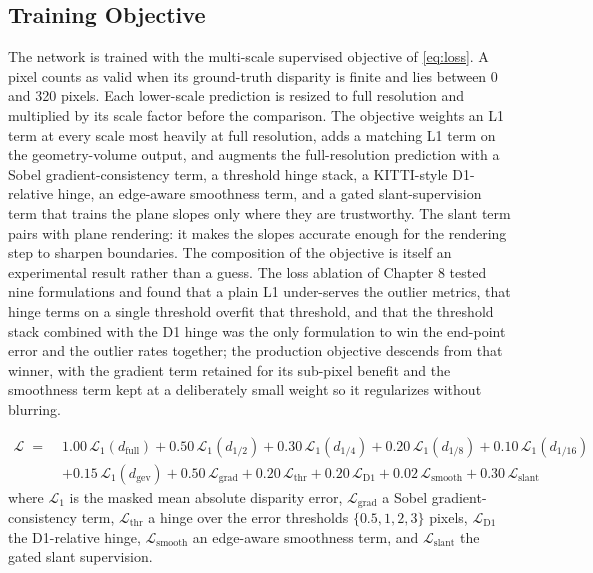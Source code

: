 \subsection{Training Objective}
The network is trained with the multi-scale supervised objective of
\eqref{eq:loss}. A pixel counts as valid when its ground-truth disparity
is finite and lies between 0 and 320 pixels. Each lower-scale prediction
is resized to full resolution and multiplied by its scale factor before
the comparison. The objective weights an L1 term at every scale most
heavily at full resolution, adds a matching L1 term on the
geometry-volume output, and augments the full-resolution prediction with
a Sobel gradient-consistency term, a threshold hinge stack, a KITTI-style
D1-relative hinge, an edge-aware smoothness term, and a gated
slant-supervision term that trains the plane slopes only where they are
trustworthy. The slant term pairs with plane rendering: it makes the
slopes accurate enough for the rendering step to sharpen boundaries. The
composition of the objective is itself an experimental result rather
than a guess. The loss ablation of Chapter 8 tested nine formulations
and found that a plain L1 under-serves the outlier metrics, that hinge
terms on a single threshold overfit that threshold, and that the
threshold stack combined with the D1 hinge was the only formulation to
win the end-point error and the outlier rates together; the production
objective descends from that winner, with the gradient term retained for
its sub-pixel benefit and the smoothness term kept at a deliberately
small weight so it regularizes without blurring.

\begin{equation}
\begin{aligned}
\mathcal{L} \;=\;& 1.00\,\mathcal{L}_{1}(d_{\mathrm{full}})
 + 0.50\,\mathcal{L}_{1}(d_{1/2})
 + 0.30\,\mathcal{L}_{1}(d_{1/4})
 + 0.20\,\mathcal{L}_{1}(d_{1/8})
 + 0.10\,\mathcal{L}_{1}(d_{1/16})\\
&+ 0.15\,\mathcal{L}_{1}(d_{\mathrm{gev}})
 + 0.50\,\mathcal{L}_{\mathrm{grad}}
 + 0.20\,\mathcal{L}_{\mathrm{thr}}
 + 0.20\,\mathcal{L}_{\mathrm{D1}}
 + 0.02\,\mathcal{L}_{\mathrm{smooth}}
 + 0.30\,\mathcal{L}_{\mathrm{slant}}
\end{aligned}
\label{eq:loss}
\end{equation}
where $\mathcal{L}_1$ is the masked mean absolute disparity error,
$\mathcal{L}_{\mathrm{grad}}$ a Sobel gradient-consistency term,
$\mathcal{L}_{\mathrm{thr}}$ a hinge over the error thresholds
$\{0.5, 1, 2, 3\}$ pixels, $\mathcal{L}_{\mathrm{D1}}$ the D1-relative
hinge, $\mathcal{L}_{\mathrm{smooth}}$ an edge-aware smoothness term, and
$\mathcal{L}_{\mathrm{slant}}$ the gated slant supervision.

